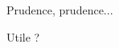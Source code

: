 \begin{bdoccaution}
    Prudence, prudence...
\end{bdoccaution}

\begin{bdoccaution}
    Utile ?
\end{bdoccaution}

